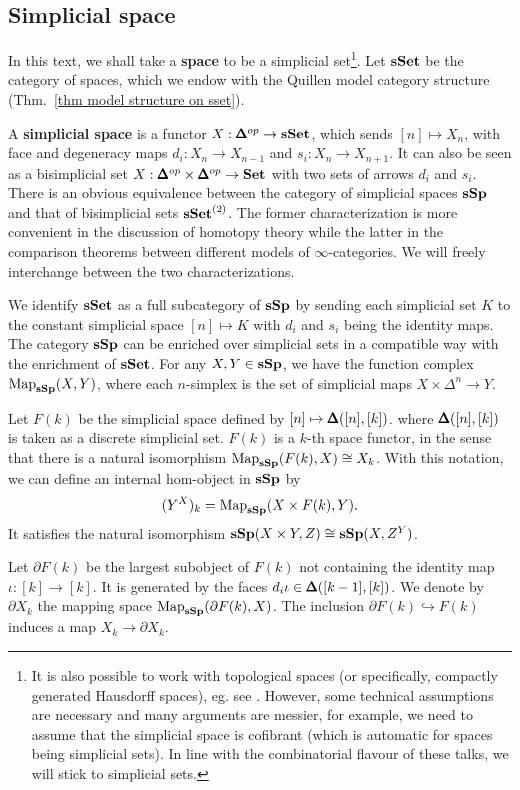 \begin{refsection}
\subsection{Simplicial space}
In this text, we shall take a \textbf{space} to be a simplicial set\footnote{It is also possible to work with topological spaces (or specifically, compactly generated Hausdorff spaces), eg. see \cite{lurie-classification-topological-field-theories}. However, some technical assumptions are necessary and many arguments are messier, for example, we need to assume that the simplicial space is cofibrant (which is automatic for spaces being simplicial sets). In line with the combinatorial flavour of these talks, we will stick to simplicial sets.}. Let $\mathbf{sSet}$ be the category of spaces, which we endow with the Quillen model category structure (Thm.~\ref{thm model structure on sset}). 

A \textbf{simplicial space} is a functor $X:\pmb{\Delta}^{op}\to\mathbf{sSet}$, which sends $[n]\mapsto X_n$, with face and degeneracy maps $d_i:X_n\to X_{n-1}$ and $s_i:X_n\to X_{n+1}$. It can also be seen as a bisimplicial set $X:\pmb{\Delta}^{op}\times\pmb{\Delta}^{op}\to \mathbf{Set}$ with two sets of arrows $d_i$ and $s_i$. There is an obvious equivalence between the category of simplicial spaces $\mathbf{sSp}$ and that of bisimplicial sets $\mathbf{sSet}^{(2)}$. The former characterization is more convenient in the discussion of homotopy theory while the latter in the comparison theorems between different models of $\infty$-categories. We will freely interchange between the two characterizations.

We identify $\mathbf{sSet}$ as a full subcategory of $\mathbf{sSp}$ by sending each simplicial set $K$ to the constant simplicial space $[n]\mapsto K$ with $d_i$ and $s_i$ being the identity maps. The category $\mathbf{sSp}$ can be enriched over simplicial sets in a compatible way with the enrichment of $\mathbf{sSet}$. For any $X,Y\in \mathbf{sSp}$, we have the function complex $\operatorname{\mathrm{Map}}_{\mathbf{sSp}}(X,Y)$, where each $n$-simplex is the set of simplicial maps $X\times\Delta^n\to Y$.

Let $F(k)$ be the simplicial space defined by $[n]\mapsto \pmb{\Delta}([n],[k])$. where $\pmb{\Delta}([n],[k])$ is taken as a discrete simplicial set. $F(k)$ is a $k$-th space functor, in the sense that there is a natural isomorphism $\operatorname{\mathrm{Map}}_{\mathbf{sSp}}(F(k),X)\cong X_k$. With this notation, we can define an internal hom-object in $\mathbf{sSp}$ by
$$(Y^X)_k=\operatorname{\mathrm{Map}}_{\mathbf{sSp}}(X\times F(k),Y).$$
It satisfies the natural isomorphism $\mathbf{sSp}(X\times Y,Z)\cong\mathbf{sSp}(X,Z^Y)$.

Let $\partial F(k)$ be the largest subobject of $F(k)$ not containing the identity map $\iota:[k]\to[k]$. It is generated by the faces $d_i\iota\in\pmb{\Delta}([k-1],[k])$. We denote by $\partial X_k$ the mapping space $\operatorname{\mathrm{Map}}_{\mathbf{sSp}}(\partial F(k),X)$. The inclusion $\partial F(k)\hookrightarrow F(k)$ induces a map $X_k\to\partial X_k$.



\end{refsection}
